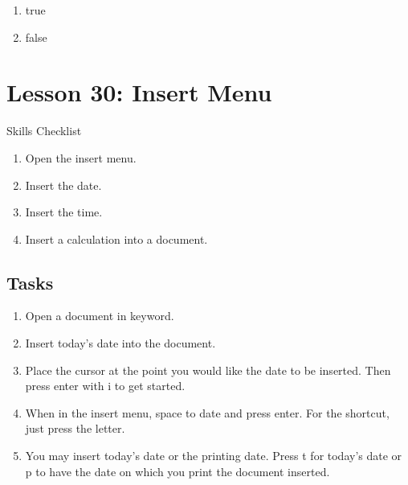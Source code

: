 \documentclass[10pt,letterpaper,twoside]{report}
\begin{document}
{{{{\begin{enumerate}
	      \begin{enumerate}
		      \item true
		            
		      \item false
	      \end{enumerate}
\end{enumerate}



\section*{Lesson 30: Insert Menu}


Skills Checklist



\begin{enumerate}
	\item Open the insert menu.
	      
	\item Insert the date.
	      
	\item Insert the time.
	      
	\item Insert a calculation into a document.
\end{enumerate}



 \subsection{Tasks}



\begin{enumerate}
	\item Open a document in keyword.
	      
	\item Insert today's date into the document.
	      
	\item Place the cursor at the point you would like the date to be inserted. Then press enter with i to get started.
	      
	\item When in the insert menu, space to date and press enter. For the shortcut, just press the letter.
	      
	\item You may insert today's date or the printing date. Press t for today's date or p to have the date on which you print the document inserted.
	      

\end{enumerate}}}}}
\end{document}
